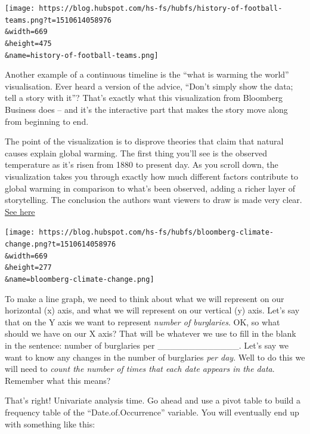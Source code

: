\documentclass[]{book}
\theoremstyle{definition}
\theoremstyle{definition}
\theoremstyle{definition}
\theoremstyle{remark}
\begin{document}
\texttt{[image: https://blog.hubspot.com/hs-fs/hubfs/history-of-football-teams.png?t=1510614058976\\\&width=669\\\&height=475\\\&name=history-of-football-teams.png]}

Another example of a continuous timeline is the ``what is warming the
world'' visualisation. Ever heard a version of the advice, ``Don't
simply show the data; tell a story with it''? That's exactly what this
visualization from Bloomberg Business does -- and it's the interactive
part that makes the story move along from beginning to end.

The point of the visualization is to disprove theories that claim that
natural causes explain global warming. The first thing you'll see is the
observed temperature as it's risen from 1880 to present day. As you
scroll down, the visualization takes you through exactly how much
different factors contribute to global warming in comparison to what's
been observed, adding a richer layer of storytelling. The conclusion the
authors want viewers to draw is made very clear.
\href{http://www.bloomberg.com/graphics/2015-whats-warming-the-world/}{See
here}

\texttt{[image: https://blog.hubspot.com/hs-fs/hubfs/bloomberg-climate-change.png?t=1510614058976\\\&width=669\\\&height=277\\\&name=bloomberg-climate-change.png]}

 To make a line graph, we need to think about what we will represent on
our horizontal (x) axis, and what we will represent on our vertical (y)
axis. Let's say that on the Y axis we want to represent \emph{number of
burglaries}. OK, so what should we have on our X axis? That will be
whatever we use to fill in the blank in the sentence: number of
burglaries per \_\_\_\_\_\_\_\_\_\_\_\_\_. Let's say we want to know any
changes in the number of burglaries \emph{per day}. Well to do this we
will need to \emph{count the number of times that each date appears in
the data}. Remember what this means?

That's right! Univariate analysis time. Go ahead and use a pivot table
to build a frequency table of the ``Date.of.Occurrence'' variable. You
will eventually end up with something like this:
\end{document}
